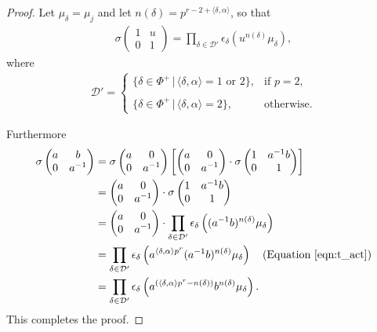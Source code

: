 \begin{proof}
Let $\mu_\delta = \mu_j$ and let $n(\delta) = p^{r-2+\langle\delta,\alpha\rangle}$, so that
\begin{align*}
	\sigma\left(\begin{matrix}1 & u\\0 & 1\end{matrix}\right) = \prod_{\delta\in\mathcal{D}'} \epsilon_\delta\left(u^{n(\delta)}\mu_\delta\right),
\end{align*}
where
\begin{align*}
		\mathcal{D}' = \left\{\begin{array}{ll}
			\{\delta \in \Phi^+ \,|\, \langle \delta, \alpha\rangle = 1\textrm{ or }2\},&\textrm{if }p = 2, \\ \\
			\{\delta \in \Phi^+ \,|\, \langle \delta, \alpha\rangle = 2\},&\textrm{otherwise}.
		\end{array}\right.
\end{align*}

Furthermore
\begin{align*}
\sigma\left(\begin{matrix}a & b\\0 & a^{-1}\end{matrix}\right) &=
\sigma\left(\begin{matrix}a & 0\\0 & a^{-1}\end{matrix}\right)\left[
\left(\begin{matrix}a & 0\\0 & a^{-1}\end{matrix}\right)\cdot
\sigma\left(\begin{matrix}1 & a^{-1}b\\0 & 1\end{matrix}\right)\right] \\ &=
\left(\begin{matrix}a & 0\\0 & a^{-1}\end{matrix}\right)\cdot
\sigma\left(\begin{matrix}1 & a^{-1}b\\0 & 1\end{matrix}\right) \\
&=
\left(\begin{matrix}a & 0\\0 & a^{-1}\end{matrix}\right)\cdot
\prod_{\delta\in\mathcal{D}'} \epsilon_\delta\left((a^{-1}b)^{n(\delta)}\mu_\delta\right)\\
&=\prod_{\delta\in\mathcal{D}'} \epsilon_\delta\left(a^{\langle\delta,\alpha\rangle p^r} (a^{-1}b)^{n(\delta)}\mu_\delta\right)\quad(\textrm{Equation \ref{eqn:t_act}})\\
&= \prod_{\delta\in\mathcal{D}'} \epsilon_\delta\left(a^{(\langle\delta,\alpha\rangle p^r - n(\delta))} b^{n(\delta)} \mu_\delta\right).
\end{align*}
This completes the proof.
\end{proof}
